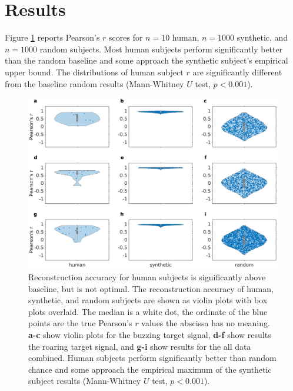 \documentclass[journal]{IEEEtran}
\begin{document}


\section{Results}


Figure \ref{fig:reconstructions} reports Pearson's $r$ scores
for $n=10$ human, $n=1000$ synthetic, and $n=1000$ random subjects.
Most human subjects perform significantly better than the random baseline
and some approach the synthetic subject's empirical upper bound.
The distributions of human subject $r$ are significantly different
from the baseline random results (Mann-Whitney $U$ test, $p < 0.001$).

\begin{figure}[ht]
    \centering
    \includegraphics[width=\linewidth]{reconstruction_violin_1.eps}
    \caption{Reconstruction accuracy for human subjects
    is significantly above baseline, but is not optimal.
    The reconstruction accuracy of human, synthetic, and random subjects
    are shown as violin plots with box plots overlaid. The median is a white dot,
    the ordinate of the blue points are the true Pearson's $r$ values \textemdash{}
    the abscissa has no meaning.
    \textbf{a-c} show violin plots for the buzzing target signal, 
    \textbf{d-f} show results the roaring target signal,
    and \textbf{g-i} show results for the all data combined.
    Human subjects perform significantly better than random chance
    and some approach the empirical maximum of the synthetic subject results
    (Mann-Whitney $U$ test, $p < 0.001$).}
    \label{fig:reconstructions}
\end{figure}
\end{document}
